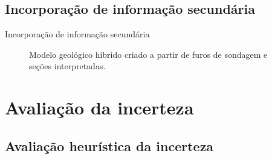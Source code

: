 \documentclass[aspectratio=169]{beamer}
\begin{document}
\subsection{Incorporação de informação secundária}

\begin{frame}{Incorporação de informação secundária}
	\begin{figure}[H]
		\caption{Modelo geológico híbrido criado a partir de furos de sondagem e seções interpretadas.}\label{mls_model}
	\end{figure}
\end{frame}

\section{Avaliação da incerteza}

\subsection{Avaliação heurística da incerteza}
\end{document}
